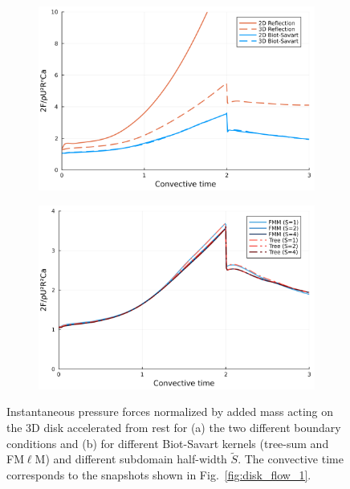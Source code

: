\documentclass[final,1p,times]{elsarticle}
\begin{document}
\begin{figure}
    \centering
    \begin{subfigure}{.5\textwidth}
        \centering
         \includegraphics[width=\textwidth]{tex//fig/Disk_force_comparison.png}
         \caption{}
    \end{subfigure}%
    \begin{subfigure}{.5\textwidth}
        \centering
        \includegraphics[width=\linewidth]{tex/fig/Disk_force_comparison_methods.png}
        \caption{}
    \end{subfigure}%
    \caption{Instantaneous pressure forces normalized by added mass acting on the 3D disk accelerated from rest for (a) the two different boundary conditions and (b) for different Biot-Savart kernels (tree-sum and FM$\ell$M) and different subdomain half-width $\tilde S$. The convective time corresponds to the snapshots shown in Fig.~\ref{fig:disk_flow_1}.}
    \label{fig:disk_forces}
\end{figure}
\end{document}
